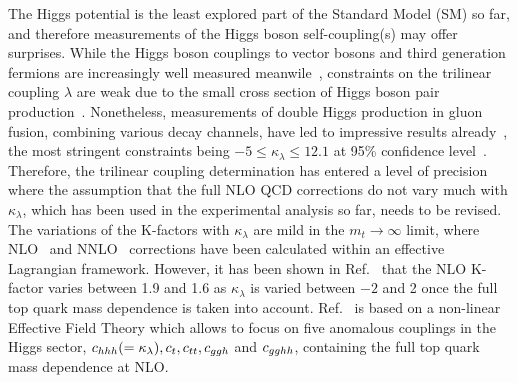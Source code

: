 The Higgs potential is the least explored part of the Standard Model (SM) so far, and therefore measurements of the Higgs boson self-coupling(s) may offer surprises.
While the Higgs boson couplings to vector bosons and third generation fermions are increasingly well measured meanwile~\cite{Khachatryan:2016vau,ATLAS:2018doi,CMS-PAS-HIG-17-031}, constraints on the trilinear coupling $\lambda$ are weak due to the small cross section of Higgs boson pair production~\cite{Glover:1987nx,Dawson:1998py,Baglio:2012np,Frederix:2014hta}.
Nonetheless, measurements of double Higgs production in gluon fusion, combining various decay channels,  have led to impressive results already~\cite{Sirunyan:2018two,ATLAS-CONF-2018-043}, 
the most stringent constraints being $-5\leq \kappa_\lambda\leq 12.1$
 at 95\% confidence level~\cite{ATLAS-CONF-2018-043}.
Therefore, the trilinear coupling determination has entered a level of precision where the assumption that the full NLO QCD corrections do not vary much with $\kappa_\lambda$, which has been used in the experimental analysis so far, needs to be revised.
The variations of the K-factors with $\kappa_\lambda$ are mild in the $m_t\to \infty$ limit, where NLO~\cite{Grober:2015cwa,Grober:2017gut} and NNLO~\cite{deFlorian:2017qfk} corrections have been calculated within an effective Lagrangian framework.
However, it has been shown in Ref.~\cite{Buchalla:2018yce} that the NLO K-factor varies between 1.9 and 1.6 as $\kappa_\lambda$ is varied between $-2$ and 2 once the full top quark mass dependence is taken into account. 
Ref.~\cite{Buchalla:2018yce} is based on a non-linear Effective Field Theory which allows to focus on five anomalous couplings in the Higgs sector, $c_{hhh}(=\kappa_\lambda), c_{t},c_{tt},c_{ggh}$ and $c_{gghh}$, containing the full top quark mass dependence at NLO.


